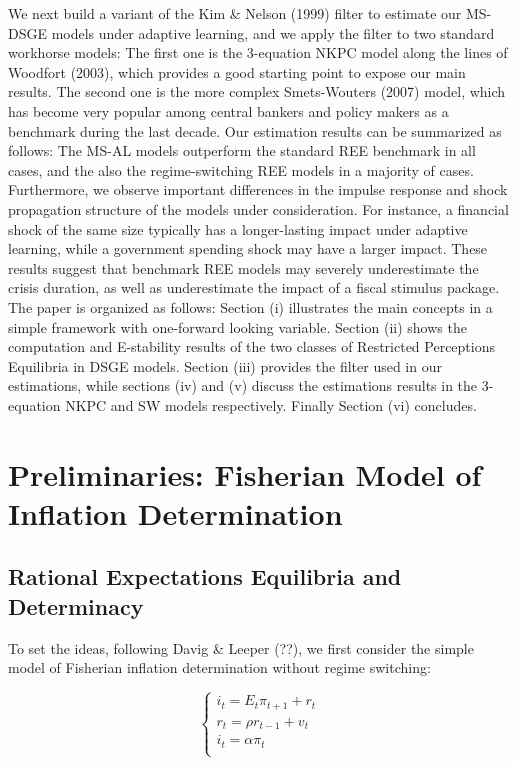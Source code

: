 \documentclass[12pt,reqno]{article}
\numberwithin{equation}{section}
\begin{document}
We next build a variant of the Kim \& Nelson (1999) filter to estimate our MS-DSGE models under adaptive learning, and we apply the filter to two standard workhorse models: The first one is the 3-equation NKPC model along the lines of Woodfort (2003), which provides a good starting point to expose our main results. The second one is the more complex Smets-Wouters (2007) model, which has become very popular among central bankers and policy makers as a benchmark during the last decade. Our estimation results can be summarized as follows: The MS-AL models outperform the standard REE benchmark in all cases, and the also the regime-switching REE models in a majority of cases. Furthermore, we observe important differences in the impulse response and shock propagation structure of the models under consideration. For instance, a financial shock of the same size typically has a longer-lasting impact under adaptive learning, while a government spending shock may have a larger impact. These results suggest that benchmark REE models may severely underestimate the crisis duration, as well as underestimate the impact of a fiscal stimulus package. \\

The paper is organized as follows: Section (i) illustrates the main concepts in a simple framework with one-forward looking variable. Section (ii) shows the  computation and E-stability results of the two classes of Restricted Perceptions Equilibria in DSGE models. Section (iii) provides the filter used in our estimations, while sections (iv) and (v) discuss the estimations results in the 3-equation NKPC and SW models respectively. Finally Section (vi) concludes.   


\section{Preliminaries: Fisherian Model of Inflation Determination}

\subsection{Rational Expectations Equilibria and Determinacy}


To set the ideas, following Davig \& Leeper (??), we first consider the simple model of Fisherian inflation determination without regime switching: 


$$
\begin{cases}
i_t = E_t \pi_{t+1} + r_t \\
r_t = \rho r_{t-1} + v_t \\
i_t = \alpha\pi_t \\
\end{cases}
$$
\end{document}

